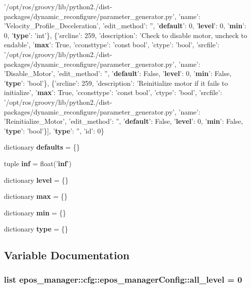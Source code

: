 \begin{DoxyCompactItemize}
'/opt/ros/groovy/lib/python2./dist-\/packages/dynamic\-\_\-reconfigure/parameter\-\_\-generator.\-py', 'name'\-: '\-Velocity\-\_\-\-Profile\-\_\-\-Deceleration', 'edit\-\_\-method'\-: '', '{\bf default}'\-: 0, '{\bf level}'\-: 0, '{\bf min}'\-: 0, '{\bf type}'\-: 'int'\}, \{'srcline'\-: 259, 'description'\-: '\-Check to disable motor, uncheck to endable', '{\bf max}'\-: \-True, 'cconsttype'\-: 'const bool', 'ctype'\-: 'bool', 'srcfile'\-: '/opt/ros/groovy/lib/python2./dist-\/packages/dynamic\-\_\-reconfigure/parameter\-\_\-generator.\-py', 'name'\-: '\-Disable\-\_\-\-Motor', 'edit\-\_\-method'\-: '', '{\bf default}'\-: \-False, '{\bf level}'\-: 0, '{\bf min}'\-: \-False, '{\bf type}'\-: 'bool'\}, \{'srcline'\-: 259, 'description'\-: '\-Reinitialize motor if it fails to initialize', '{\bf max}'\-: \-True, 'cconsttype'\-: 'const bool', 'ctype'\-: 'bool', 'srcfile'\-: '/opt/ros/groovy/lib/python2./dist-\/packages/dynamic\-\_\-reconfigure/parameter\-\_\-generator.\-py', 'name'\-: '\-Reinitialize\-\_\-\-Motor', 'edit\-\_\-method'\-: '', '{\bf default}'\-: \-False, '{\bf level}'\-: 0, '{\bf min}'\-: \-False, '{\bf type}'\-: 'bool'\}], '{\bf type}'\-: '', 'id'\-: 0\}
\item 
dictionary {\bf defaults} = \{\}
\item 
tuple {\bf inf} = float('{\bf inf}')
\item 
dictionary {\bf level} = \{\}
\item 
dictionary {\bf max} = \{\}
\item 
dictionary {\bf min} = \{\}
\item 
dictionary {\bf type} = \{\}
\end{DoxyCompactItemize}


\subsection{\-Variable \-Documentation}
\subsubsection[{all\-\_\-level}]{\setlength{\rightskip}{0pt plus 5cm}list {\bf epos\-\_\-manager\-::cfg\-::epos\-\_\-manager\-Config\-::all\-\_\-level} = 0}\label{namespaceepos__manager_1_1cfg_1_1epos__managerConfig_a053466f2b18ffdb4913b7f663e2d0e3c}


